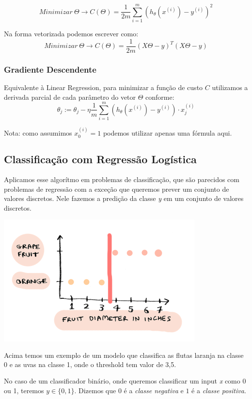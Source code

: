 \documentclass[11pt,a4paper,leqno]{article}
\begin{document}
\[
Minimizar \ \Theta \rightarrow C (\Theta) = \frac{1}{2m} \sum_{i=1}^m ( h_\theta (x^{(i)}) - y^{(i)}) ^ 2
\]

Na forma vetorizada podemos escrever como:
\[
Minimizar \ \Theta \rightarrow C (\Theta) = \frac{1}{2m} (X \Theta - y)^T (X \Theta - y)
\]

\subsubsection{Gradiente Descendente}
Equivalente à Linear Regression, para minimizar a função de custo $C$ utilizamos a derivada parcial de cada parâmetro do vetor $\Theta$ conforme:
\[
\theta_j := \theta_j - \eta \frac{1}{m} \sum\limits_{i=1}^{m} (h_\theta(x^{(i)}) - y^{(i)}) \cdot x_j^{(i)}
\]

Nota: como assumimos $x_0^{(i)} = 1$ podemos utilizar apenas uma fórmula aqui.



\subsection{Classificação com Regressão Logística}
Aplicamos esse algorítmo em problemas de classificação, que são parecidos com problemas de regressão com a exceção que queremos prever um conjunto de valores discretos.
Nele fazemos a predição da classe \emph{y} em um conjunto de valores discretos.

\includegraphics[scale=0.5]{Images/logistic_regression_plot_fit.png} 

Acima temos um exemplo de um modelo que classifica as flutas laranja na classe 0 e as uvas na classe 1, onde o threshold tem valor de 3,5.

No caso de um classificador binário, onde queremos classificar um input \emph{x} como 0 ou 1, teremos $y \in \{0, 1\}$.
Dizemos que $0$ é a \emph{classe negativa} e $1$ é a \emph{classe positiva}.
\end{document}

